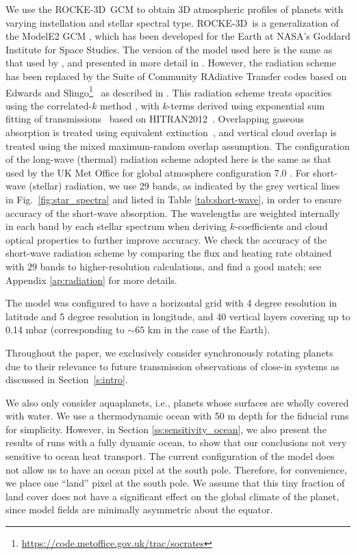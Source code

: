 \documentclass[11pt,numberedappendix,twocolappendix,]{emulateapj}
\def\modelE{ROCKE-3D}
\begin{document}
We use the \modelE \ GCM \citep{Way2017} to obtain 3D atmospheric profiles of planets with varying instellation and stellar spectral type. 
\modelE \ is a generalization of the ModelE2 GCM \citep{Schmidt2014}, which has been developed for the Earth at NASA's Goddard Institute for Space Studies. 
%
The version of the model used here is the same as that used by \citet{Way2016}, and presented in more detail in \citet{Way2017}.
However, the radiation scheme has been replaced by the Suite of Community RAdiative Transfer codes based on Edwards and Slingo\footnote{\url{https://code.metoffice.gov.uk/trac/socrates}}~\citep[SOCRATES,][]{EdwardsSlingo1996,Edwards1996} as described in \citet{Way2017}. 
This radiation scheme treats opacities using the correlated-$k$ method \citep{Lacis1991,Goody1989}, with $k$-terms derived using exponential sum fitting of transmissions~\citep{Wiscombe1977} based on HITRAN2012~\citep{Rothman2013}.
Overlapping gaseous absorption is treated using equivalent extinction~\citep{Edwards1996,Amundsen2016}, and vertical cloud overlap is treated using the mixed maximum-random overlap assumption.
The configuration of the long-wave (thermal) radiation scheme adopted here is the same as that used by the UK Met Office for global atmosphere configuration 7.0 \citep[GA7.0;][]{Walters2017}. 
For short-wave (stellar) radiation, we use 29 bands, as indicated by the grey vertical lines in Fig.~\ref{fig:star_spectra} and listed in Table \ref{tab:short-wave}, in order to ensure accuracy of the short-wave absorption. 
The wavelengths are weighted internally in each band by each stellar spectrum when deriving $k$-coefficients and cloud optical properties to further improve accuracy. 
We check the accuracy of the short-wave radiation scheme by comparing the flux and heating rate obtained with $29$ bands to higher-resolution calculations, and find a good match; see Appendix \ref{ap:radiation} for more details. 

The model was configured to have a horizontal grid with 4 degree resolution in latitude and 5 degree resolution in longitude, and 40 vertical layers covering up to 0.14 mbar (corresponding to $\sim 65$ km in the case of the Earth). 

Throughout the paper, we exclusively consider synchronously rotating planets due to their relevance to future transmission observations of close-in systems as discussed in Section~\ref{s:intro}. 

We also only consider aquaplanets, i.e., planets whose surfaces are wholly covered with water. 
We use a thermodynamic ocean with 50 m depth for the fiducial runs for simplicity. 
However, in Section \ref{ss:sensitivity_ocean}, we also present the results of runs with a fully dynamic ocean, to show that our conclusions not very sensitive to ocean heat transport. 
The current configuration of the model does not allow us to have an ocean pixel at the south pole. Therefore, for convenience, we place one ``land'' pixel at the south pole. We assume that this tiny fraction of land cover does not have a significant effect on the global climate of the planet, since model fields are minimally asymmetric about the equator. 
\end{document}
